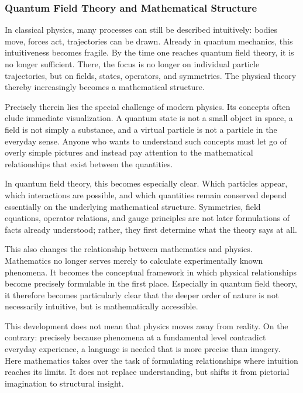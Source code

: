 \subsubsection{Quantum Field Theory and Mathematical Structure}

In classical physics, many processes can still be described intuitively:
bodies move,
forces act,
trajectories can be drawn.
Already in quantum mechanics, this intuitiveness becomes fragile.
By the time one reaches quantum field theory, it is no longer sufficient.
There, the focus is no longer on individual particle trajectories,
but on fields,
states,
operators,
and symmetries.
The physical theory thereby increasingly becomes a mathematical structure.

Precisely therein lies the special challenge of modern physics.
Its concepts often elude immediate visualization.
A quantum state is not a small object in space,
a field is not simply a substance,
and a virtual particle is not a particle in the everyday sense.
Anyone who wants to understand such concepts
must let go of overly simple pictures
and instead pay attention to the mathematical relationships
that exist between the quantities.

In quantum field theory, this becomes especially clear.
Which particles appear,
which interactions are possible,
and which quantities remain conserved
depend essentially on the underlying mathematical structure.
Symmetries,
field equations,
operator relations,
and gauge principles
are not later formulations of facts already understood;
rather, they first determine what the theory says at all.

This also changes the relationship between mathematics and physics.
Mathematics no longer serves merely to calculate experimentally known phenomena.
It becomes the conceptual framework
in which physical relationships become precisely formulable in the first place.
Especially in quantum field theory,
it therefore becomes particularly clear
that the deeper order of nature
is not necessarily intuitive,
but is mathematically accessible.

This development does not mean
that physics moves away from reality.
On the contrary:
precisely because phenomena at a fundamental level
contradict everyday experience,
a language is needed
that is more precise than imagery.
Here mathematics takes over the task
of formulating relationships
where intuition reaches its limits.
It does not replace understanding,
but shifts it from pictorial imagination
to structural insight.

